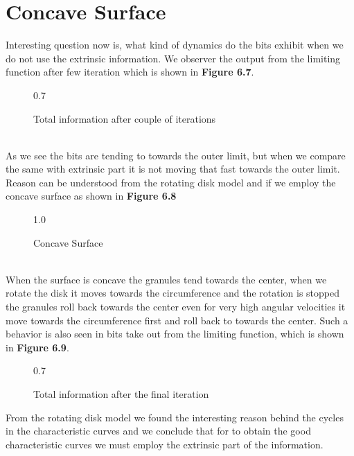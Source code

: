 \section{Concave Surface}
Interesting question now is, what kind of dynamics do the bits exhibit when we do not use the extrinsic information. We observer the output from the limiting function after few iteration which is shown in \textbf{Figure 6.7}.
\begin{figure}[htb]
\centerline{  {0.7} }
\caption{Total information after couple of iterations}
\end{figure}\\
As we see the bits are tending to towards the outer limit, but when we compare the same with extrinsic part it is not moving that fast towards the outer limit. Reason can be understood from the rotating disk model and if we employ the concave surface as shown in \textbf{Figure 6.8}
\begin{figure}[htb]
\centerline{  {1.0} }
\caption{Concave Surface}
\end{figure}\\
When the surface is concave the granules tend towards the center, when we rotate the disk it moves towards the circumference and the rotation is stopped the granules roll back towards the center even for very high angular velocities it move towards the circumference first and roll back to towards the center. Such a behavior is also seen in bits take out from the limiting function, which is shown in \textbf{Figure 6.9}.
\begin{figure}[htb]
\centerline{  {0.7} }
\caption{Total information after the final iteration}
\end{figure}
\newpage
\newpage
\newpage
\newpage
From the rotating disk model we found the interesting reason behind the cycles in the characteristic curves and we conclude that for to obtain the good characteristic curves we must employ the extrinsic part of the information.
